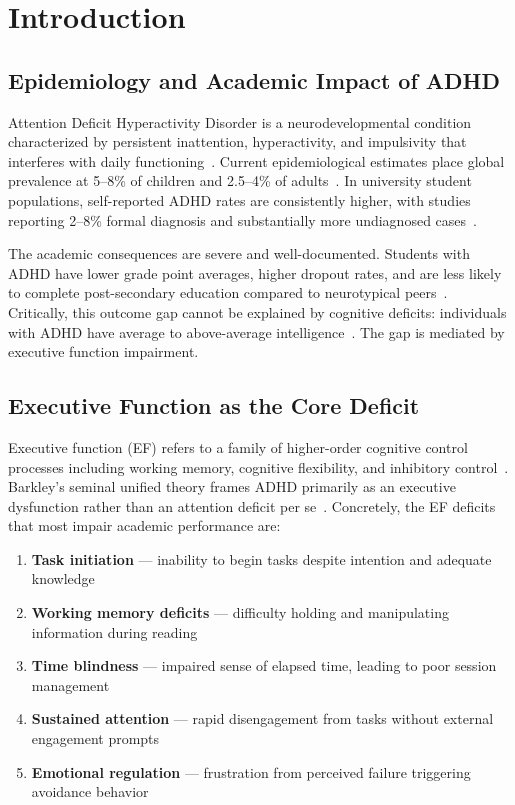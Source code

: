 \documentclass[conference]{IEEEtran}
\begin{document}
\section{Introduction}

\subsection{Epidemiology and Academic Impact of ADHD}

Attention Deficit Hyperactivity Disorder is a neurodevelopmental condition characterized by persistent inattention, hyperactivity, and impulsivity that interferes with daily functioning~\cite{american2013diagnostic}. Current epidemiological estimates place global prevalence at 5--8\% of children and 2.5--4\% of adults~\cite{polanczyk2015adhd,fayyad2017cross}. In university student populations, self-reported ADHD rates are consistently higher, with studies reporting 2--8\% formal diagnosis and substantially more undiagnosed cases~\cite{weyandt2013adhd}.

The academic consequences are severe and well-documented. Students with ADHD have lower grade point averages, higher dropout rates, and are less likely to complete post-secondary education compared to neurotypical peers~\cite{norwalk2016postsecondary}. Critically, this outcome gap cannot be explained by cognitive deficits: individuals with ADHD have average to above-average intelligence~\cite{biederman1993educational}. The gap is mediated by executive function impairment.

\subsection{Executive Function as the Core Deficit}

Executive function (EF) refers to a family of higher-order cognitive control processes including working memory, cognitive flexibility, and inhibitory control~\cite{miyake2000unity}. Barkley's seminal unified theory frames ADHD primarily as an executive dysfunction rather than an attention deficit per se~\cite{barkley1997adhd}. Concretely, the EF deficits that most impair academic performance are:

\begin{enumerate}
  \item \textbf{Task initiation} — inability to begin tasks despite intention and adequate knowledge
  \item \textbf{Working memory deficits} — difficulty holding and manipulating information during reading
  \item \textbf{Time blindness} — impaired sense of elapsed time, leading to poor session management
  \item \textbf{Sustained attention} — rapid disengagement from tasks without external engagement prompts
  \item \textbf{Emotional regulation} — frustration from perceived failure triggering avoidance behavior
\end{enumerate}
\end{document}

